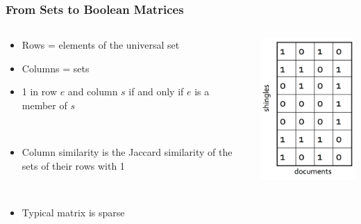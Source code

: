 \documentclass[svgnames]{beamer}
\begin{document}
\begin{frame} \frametitle{From Sets to Boolean Matrices}

 \begin{columns}[T]
    \begin{column}{0.5\textwidth}
\begin{itemize}
\item Rows = elements of the universal set
\item Columns = sets
\item 1 in row $e$ and column $s$ if and only if $e$ is a member of $s$

~\\

\item Column similarity is the Jaccard similarity of the sets of their rows with 1

~\\

\item Typical matrix is sparse
\end{itemize}
  \end{column}
  \begin{column}{0.5\textwidth}
   \includegraphics[width=5cm]{matrix}
  \end{column}
 \end{columns}
\end{frame}

  
\end{document}
